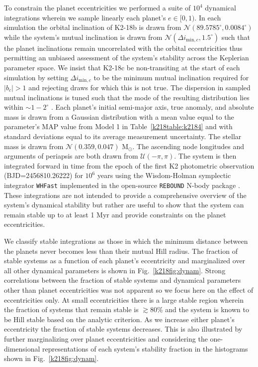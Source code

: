 To constrain the planet eccentricities
we performed a suite of $10^4$ dynamical integrations wherein we sample linearly
each planet's $e \in [0,1)$.
In each simulation the orbital inclination of K2-18b is drawn from
$\mathcal{N}(89.5785^{\circ},0.0084^{\circ})$ while the
system's mutual inclination is drawn from $\mathcal{N}(\Delta i_{\text{min},c},1.5^{\circ})$ 
such that the planet inclinations remain uncorrelated with the orbital eccentricities thus permitting
an unbiased assessment of the system's stability across the Keplerian parameter space. 
We insist that K2-18c be non-transiting at the start of each simulation by setting
$\Delta i_{\text{min},c}$ to be the minimum mutual inclination required for $|b_c|>1$
and rejecting draws for which this is not true. 
The dispersion in sampled mutual inclinations is tuned such that the mode of the resulting distribution
lies within $\sim 1-2^{\circ}$ \citep{fabrycky14}.
Each planet's initial semi-major axis, true anomaly, and absolute mass is drawn from a Gaussian
distribution with a mean value equal to the parameter's MAP value from Model 1 in
Table~\ref{k218table:k2184} and with standard deviations equal to its average measurement uncertainty.
The stellar mass is drawn from $\mathcal{N}(0.359,0.047)$ M$_{\odot}$.
The ascending node longitudes and arguments of
periapsis are both drawn from $\mathcal{U}(-\pi,\pi)$. The system is then integrated forward in time
from the epoch of the first K2 photometric observation (BJD=2456810.26222) for $10^6$ years using 
the Wisdom-Holman symplectic integrator \texttt{WHFast} \citep{rein15} implemented in the
open-source \texttt{REBOUND} N-body package \citep{rein12}. These integrations are not intended to
provide a comprehensive overview of the system's dynamical stability but rather are 
useful to show that the 
system can remain stable up to at least 1 Myr and provide constraints on the planet
eccentricities.

We classify stable integrations as those in which the minimum distance between the planets never
becomes less than their mutual Hill radius. The fraction of stable systems as a function of each
planet's eccentricity and marginalized over all other dynamical parameters 
is shown in Fig.~\ref{k218fig:dynam}. Strong correlations between the fraction of stable systems and
dynamical parameters other than planet eccentricities was not apparent so we focus here on the
effect of eccentricities only. At small eccentricities there is a 
large stable region wherein the fraction of systems that remain stable is $\gtrsim 80$\%
and the system is known to be Hill stable based on the analytic criterion.
As we increase either planet's eccentricity the fraction of stable systems decreases.
This is also illustrated by further marginalizing over planet eccentricities and considering the 
one-dimensional representations of each system's stability fraction in the histograms shown in 
Fig.~\ref{k218fig:dynam}.


